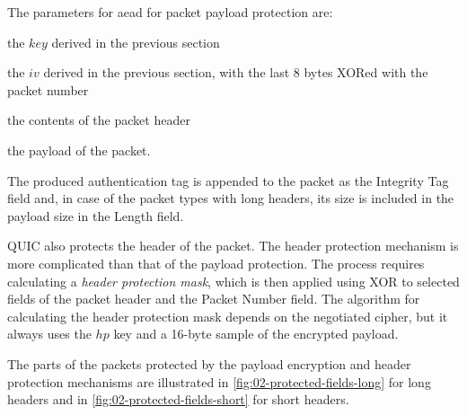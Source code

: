 The parameters for \gls{aead} for packet payload protection are:

\begin{itemize}

     the $key$ derived in the previous section

     the $iv$ derived in the previous section, with the last 8 bytes XORed with the
packet number

     the contents of the packet header

     the payload of the packet.

\end{itemize}

The produced authentication tag is appended to the packet as the Integrity Tag field and, in case of
the packet types with long headers, its size is included in the payload size in the Length field.

QUIC also protects the header of the packet. The header protection mechanism is more complicated
than that of the payload protection. The process requires calculating a \textit{header protection
  mask}, which is then applied using XOR to selected fields of the packet header and the Packet
Number field. The algorithm for calculating the header protection mask depends on the negotiated
cipher, but it always uses the $hp$ key and a 16-byte sample of the encrypted payload.

The parts of the packets protected by the payload encryption and header protection mechanisms are
illustrated in \autoref{fig:02-protected-fields-long} for long headers and in
\autoref{fig:02-protected-fields-short} for short headers.

